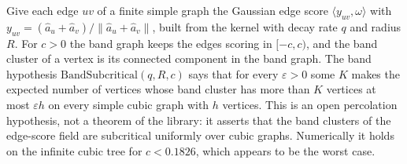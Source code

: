\begin{definition}
  \label{def:lowerbounds-algebraic-gaussian-band-subcritical}
  \leanok
  Give each edge $uv$ of a finite simple graph the Gaussian edge score
  $\langle y_{uv},\omega\rangle$ with
  $y_{uv}=(\hat a_u+\hat a_v)/\lVert\hat a_u+\hat a_v\rVert$, built from the kernel with decay
  rate $q$ and radius $R$. For $c>0$ the band graph keeps the edges scoring in $[-c,c)$, and
  the band cluster of a vertex is its connected component in the band graph. The band
  hypothesis $\mathrm{BandSubcritical}(q,R,c)$ says that for every $\varepsilon>0$ some $K$
  makes the expected number of vertices whose band cluster has more than $K$ vertices at most
  $\varepsilon h$ on every simple cubic graph with $h$ vertices. This is an open percolation
  hypothesis, not a theorem of the library: it asserts that the band clusters of the
  edge-score field are subcritical uniformly over cubic graphs. Numerically it holds on the
  infinite cubic tree for $c<0.1826$, which appears to be the worst case.
\end{definition}

